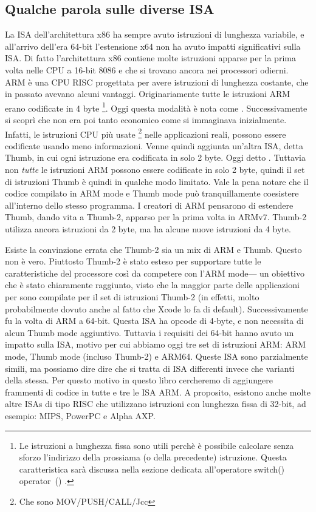 %
%
%

\subsection{Qualche parola sulle diverse \ac{ISA}}
La \ac{ISA} dell'architettura x86 ha sempre avuto istruzioni di lunghezza variabile, e all'arrivo dell'era 64-bit l'estensione x64 non ha avuto impatti significativi sulla \ac{ISA}. Di fatto l'architettura x86 contiene molte istruzioni apparse per la prima volta nelle CPU a 16-bit 8086 e che si trovano ancora nei processori odierni.
ARM è una \ac{CPU} \ac{RISC} progettata per avere istruzioni di lunghezza costante, che in passato avevano alcuni vantaggi.
Originariamente tutte le istruzioni ARM erano codificate in 4 byte%
\footnote{
Le istruzioni a lunghezza fissa sono utili perchè è possibile calcolare senza sforzo l'indirizzo della prossiama (o della precedente) istruzione.
Questa caratteristica sarà discussa nella sezione dedicata all'operatore switch() operator~() .
}.
Oggi questa modalità è nota come .
Successivamente si scoprì che non era poi tanto economico come si immaginava inizialmente.
Infatti, le istruzioni \ac{CPU} più usate \footnote{Che sono MOV/PUSH/CALL/Jcc} nelle applicazioni reali, possono essere codificate usando meno informazioni.
Venne quindi aggiunta un'altra \ac{ISA}, detta Thumb, in cui ogni istruzione era codificata in solo 2 byte.
Oggi detto .
Tuttavia non \emph{tutte} le istruzioni ARM possono essere codificate in solo 2 byte, quindi il set di istruzioni Thumb è quindi in qualche modo limitato.
Vale la pena notare che il codice compilato in ARM mode e Thumb mode può tranquillamente coesistere all'interno dello stesso programma.
I creatori di ARM pensarono di estendere Thumb, dando vita a Thumb-2, apparso per la prima volta in ARMv7.
Thumb-2 utilizza ancora istruzioni da 2 byte, ma ha alcune nuove istruzioni da 4 byte.

Esiste la convinzione errata che Thumb-2 sia un mix di ARM e Thumb. Questo non è vero.
Piuttosto Thumb-2 è stato esteso per supportare tutte le caratteristiche del processore così da competere con l'ARM mode--- un obiettivo che è stato chiaramente raggiunto, visto che la maggior parte delle applicazioni per \idevices sono compilate per il set di istruzioni Thumb-2 (in effetti, molto probabilmente dovuto anche al fatto che Xcode lo fa di default).
Successivamente fu la volta di ARM a 64-bit. Questa \ac{ISA} ha opcode di 4-byte, e non necessita di alcun Thumb mode aggiuntivo.
Tuttavia i requisiti dei 64-bit hanno avuto un impatto sulla \ac{ISA}, motivo per cui abbiamo oggi tre set di istruzioni ARM: ARM mode, Thumb mode (incluso Thumb-2) e ARM64.
Queste \ac{ISA} sono parzialmente simili, ma possiamo dire dire che si tratta di \ac{ISA} differenti invece che varianti della stessa.
Per questo motivo in questo libro cercheremo di aggiungere frammenti di codice in tutte e tre le \ac{ISA} ARM.
%
%
%
A proposito, esistono anche molte altre \ac{ISA}s di tipo \ac{RISC} che utilizzano istruzioni con lunghezza fissa di 32-bit, ad esempio: MIPS, PowerPC e Alpha AXP.
